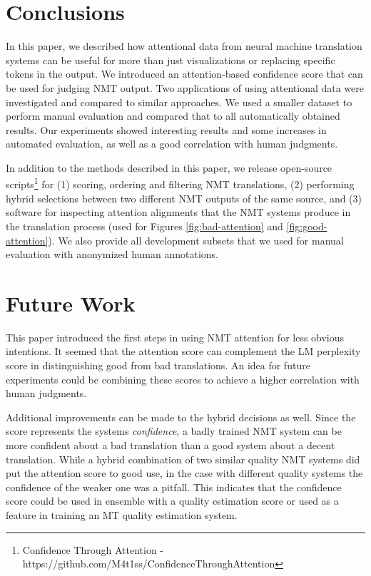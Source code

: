\documentclass[]{article}
\begin{document}
\FloatBarrier

\section{Conclusions}
\label{sctConclusions}

In this paper, we described how attentional data from neural machine translation systems can be useful for more than just visualizations or replacing specific tokens in the output. We introduced an attention-based confidence score that can be used for judging NMT output. Two applications of using attentional data were investigated and compared to similar approaches. We used a smaller dataset to perform manual evaluation and compared that to all automatically obtained results. Our experiments showed interesting results and some increases in automated evaluation, as well as a good correlation with human judgments.

In addition to the methods described in this paper, we release open-source scripts\footnote{Confidence Through Attention - https://github.com/M4t1ss/ConfidenceThroughAttention} for (1) scoring, ordering and filtering NMT translations, (2) performing hybrid selections between two different NMT outputs of the same source, and (3) software for inspecting attention alignments that the NMT systems produce in the translation process (used for Figures \ref{fig:bad-attention} and \ref{fig:good-attention}). We also provide all development subsets that we used for manual evaluation with anonymized human annotations.

\section{Future Work}
\label{sctFuture}

This paper introduced the first steps in using NMT attention for less obvious intentions. It seemed that the attention score can complement the LM perplexity score in distinguishing good from bad translations. An idea for future experiments could be combining these scores to achieve a higher correlation with human judgments.

Additional improvements can be made to the hybrid decisions as well. Since the score represents the systems \textit{confidence}, a badly trained NMT system can be more confident about a bad translation than a good system about a decent translation. While a hybrid combination of two similar quality NMT systems did put the attention score to good use, in the case with different quality systems the confidence of the weaker one was a pitfall. This indicates that the confidence score could be used in ensemble with a quality estimation score or used as a feature in training an MT quality estimation system.
\end{document}
